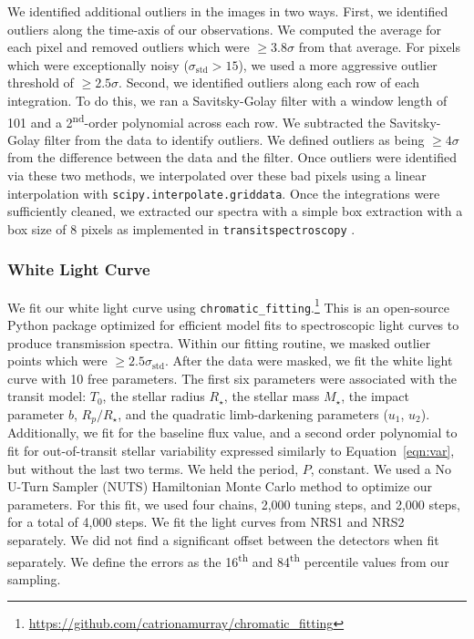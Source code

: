\documentclass[twocolumn]{aastex63} %
\begin{document}
We identified additional outliers in the images in two ways. First, we identified outliers along the time-axis of our observations. We computed the average for each pixel and removed outliers which were $\geq3.8 \sigma$ from that average. For pixels which were exceptionally noisy ($\sigma_\textrm{std} > 15$), we used a more aggressive outlier threshold of $\geq2.5 \sigma$. Second, we identified outliers along each row of each integration. To do this, we ran a Savitsky-Golay filter with a window length of 101 and a 2\textsuperscript{nd}-order polynomial across each row. We subtracted the Savitsky-Golay filter from the data to identify outliers. We defined outliers as being $\geq 4\sigma$ from the difference between the data and the filter. Once outliers were identified via these two methods, we interpolated over these bad pixels using a linear interpolation with \texttt{scipy.interpolate.griddata}. Once the integrations were sufficiently cleaned, we extracted our spectra with a simple box extraction with a box size of 8 pixels as implemented in \texttt{transitspectroscopy} \citep{espinoza_nestor_2022_6960924}.

\subsubsection{White Light Curve}\label{subsubsec:feinstein}

We fit our white light curve using \texttt{chromatic\_fitting}.\footnote{\url{https://github.com/catrionamurray/chromatic_fitting}} This is an open-source Python package optimized for efficient model fits to spectroscopic light curves to produce transmission spectra. Within our fitting routine, we masked outlier points which were $\geq 2.5\sigma_\textrm{std}$. After the data were masked, we fit the white light curve with 10 free parameters. The first six parameters were associated with the transit model: $T_0$, the stellar radius $R_\star$, the stellar mass $M_\star$, the impact parameter $b$, $R_p/R_\star$, and the quadratic limb-darkening parameters ($u_1$, $u_2$). Additionally, we fit for the baseline flux value, and a second order polynomial to fit for out-of-transit stellar variability expressed similarly to Equation~\ref{eqn:var}, but without the last two terms. We held the period, $P$, constant. We used a No U-Turn Sampler (NUTS) Hamiltonian Monte Carlo method to optimize our parameters. For this fit, we used four chains, 2,000 tuning steps, and 2,000 steps, for a total of 4,000 steps. We fit the light curves from NRS1 and NRS2 separately. We did not find a significant offset between the detectors when fit separately. We define the errors as the 16\textsuperscript{th} and 84\textsuperscript{th} percentile values from our sampling.
\end{document}
